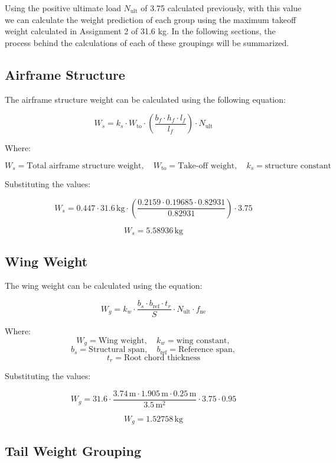 \documentclass[12pt]{report}
\begin{document}
Using the positive ultimate load \(N_{\text{ult}}\) of 3.75 calculated previously, with this value we can calculate the weight prediction of each group using the maximum takeoff weight calculated in Assignment 2 of 31.6 kg. In the following sections, the process behind the calculations of each of these groupings will be summarized.

\subsection{Airframe Structure}

The airframe structure weight can be calculated using the following equation:

\[
W_s = k_s \cdot W_{\text{to}} \cdot \left( \frac{b_f \cdot h_f \cdot l_f}{l_f} \right) \cdot N_{\text{ult}}
\]

Where:

\[
W_s = \text{Total airframe structure weight}, \quad W_{\text{to}} = \text{Take-off weight}, \quad k_s = \text{structure constant}
\]

Substituting the values:

\[
W_s = 0.447 \cdot 31.6 \, \text{kg} \cdot \left( \frac{0.2159 \cdot 0.19685 \cdot 0.82931}{0.82931} \right) \cdot 3.75
\]

\[
W_s = 5.58936 \, \text{kg}
\]

\subsection{Wing Weight}

The wing weight can be calculated using the equation:

\[
W_g = k_w \cdot \frac{b_s \cdot b_{\text{ref}} \cdot t_r}{S} \cdot N_{\text{ult}} \cdot f_{\text{ne}}
\]

Where:
\[
W_g = \text{Wing weight}, \quad k_w = \text{wing constant}, 
\]
\[
b_s = \text{Structural span}, \quad b_{\text{ref}} = \text{Reference span}, 
\]
\[
t_r = \text{Root chord thickness}
\]

Substituting the values:

\[
W_g = 31.6 \cdot \frac{3.74 \, \text{m} \cdot 1.905 \, \text{m} \cdot 0.25 \, \text{m}}{3.5 \, \text{m}^2} \cdot 3.75 \cdot 0.95
\]

\[
W_g = 1.52758 \, \text{kg}
\]

\subsection{Tail Weight Grouping}
\end{document}
